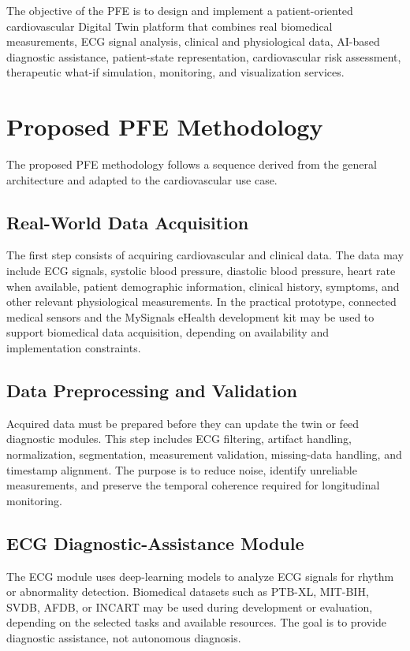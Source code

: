 The objective of the PFE is to design and implement a patient-oriented cardiovascular Digital Twin platform that combines real biomedical measurements, ECG signal analysis, clinical and physiological data, AI-based diagnostic assistance, patient-state representation, cardiovascular risk assessment, therapeutic what-if simulation, monitoring, and visualization services.

\section{Proposed PFE Methodology}
The proposed PFE methodology follows a sequence derived from the general architecture and adapted to the cardiovascular use case.

\subsection{Real-World Data Acquisition}
The first step consists of acquiring cardiovascular and clinical data. The data may include ECG signals, systolic blood pressure, diastolic blood pressure, heart rate when available, patient demographic information, clinical history, symptoms, and other relevant physiological measurements. In the practical prototype, connected medical sensors and the MySignals eHealth development kit may be used to support biomedical data acquisition, depending on availability and implementation constraints.

\subsection{Data Preprocessing and Validation}
Acquired data must be prepared before they can update the twin or feed diagnostic modules. This step includes ECG filtering, artifact handling, normalization, segmentation, measurement validation, missing-data handling, and timestamp alignment. The purpose is to reduce noise, identify unreliable measurements, and preserve the temporal coherence required for longitudinal monitoring.

\subsection{ECG Diagnostic-Assistance Module}
The ECG module uses deep-learning models to analyze ECG signals for rhythm or abnormality detection. Biomedical datasets such as PTB-XL, MIT-BIH, SVDB, AFDB, or INCART may be used during development or evaluation, depending on the selected tasks and available resources. The goal is to provide diagnostic assistance, not autonomous diagnosis.

